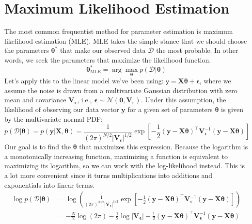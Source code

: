 \section{Maximum Likelihood Estimation}
The most common frequentist method for parameter estimation is maximum likelihood estimation (MLE). MLE takes the simple stance that we should choose the parameters $\boldsymbol{\theta}^*$ that make our observed data $\mathcal{D}$ the most probable. In other words, we seek the parameters that maximize the likelihood function.
\begin{equation}
    \boldsymbol{\theta}_{\text{MLE}}^* = \arg\max_{\boldsymbol{\theta}} p(\mathcal{D}|\boldsymbol{\theta})
\end{equation}
Let's apply this to the linear model we've been using: $\boldsymbol{\mathsf{y}} = \mathbf{X}\boldsymbol{\theta} + \boldsymbol{\epsilon}$, where we assume the noise is drawn from a multivariate Gaussian distribution with zero mean and covariance $\mathbf{V}_{\boldsymbol{\epsilon}}$, i.e., $\boldsymbol{\epsilon} \sim \mathcal{N}(\mathbf{0}, \mathbf{V}_{\boldsymbol{\epsilon}})$. Under this assumption, the likelihood of observing our data vector $\mathbf{y}$ for a given set of parameters $\boldsymbol{\theta}$ is given by the multivariate normal PDF:
\begin{equation}
    p(\mathcal{D}|\boldsymbol{\theta}) = p(\mathbf{y}|\mathbf{X}, \boldsymbol{\theta}) = \frac{1}{(2\pi)^{N/2}|\mathbf{V}_{\boldsymbol{\epsilon}}|^{1/2}} \exp\left[-\frac{1}{2}(\mathbf{y} - \mathbf{X}\boldsymbol{\theta})^\top \mathbf{V}_{\boldsymbol{\epsilon}}^{-1}(\mathbf{y} - \mathbf{X}\boldsymbol{\theta})\right]
\end{equation}
Our goal is to find the $\boldsymbol{\theta}$ that maximizes this expression. Because the logarithm is a monotonically increasing function, maximizing a function is equivalent to maximizing its logarithm, so we can work with the log-likelihood instead. This is a lot more convenient since it turns multiplications into additions and exponentials into linear terms.
\begin{align*}
    \log p(\mathcal{D}|\boldsymbol{\theta}) &= \log \left( \frac{1}{(2\pi)^{N/2}|\mathbf{V}_{\boldsymbol{\epsilon}}|^{1/2}} \exp\left[-\frac{1}{2}(\mathbf{y} - \mathbf{X}\boldsymbol{\theta})^\top \mathbf{V}_{\boldsymbol{\epsilon}}^{-1}(\mathbf{y} - \mathbf{X}\boldsymbol{\theta})\right] \right) \\
    &= -\frac{N}{2}\log(2\pi) - \frac{1}{2}\log|\mathbf{V}_{\boldsymbol{\epsilon}}| - \frac{1}{2}(\mathbf{y} - \mathbf{X}\boldsymbol{\theta})^\top \mathbf{V}_{\boldsymbol{\epsilon}}^{-1}(\mathbf{y} - \mathbf{X}\boldsymbol{\theta})
\end{align*}
